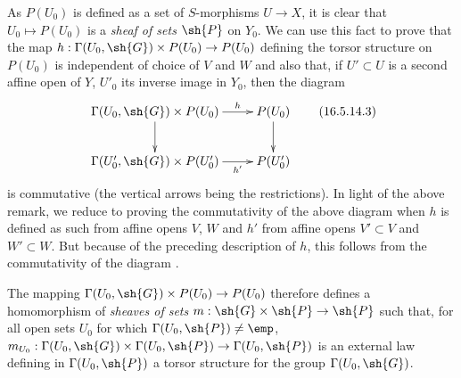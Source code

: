 \begin{env}[16.5.14]
As $P(U_0)$ is defined as a set of $S$-morphisms $U \to X$, it is clear that $U_0 \mapsto P(U_0)$ is a \emph{sheaf of sets} $\sh{P}$ on $Y_0$.
We can use this fact to prove that the map $h : \Gamma(U_0, \sh{G}) \times P(U_0) \to P(U_0)$ defining the torsor structure on $P(U_0)$ is independent of choice of $V$ and $W$ and also that, if $U' \subset U$ is a second affine open of $Y$, $U'_0$ its inverse image in $Y_0$, then the diagram
\[
\label{IV.16.5.14.3}
  \xymatrix{
    \Gamma(U_0, \sh{G}) \times P(U_0) \ar[d] \ar[r]^-h & P(U_0) \ar[d] \\
    \Gamma(U'_0, \sh{G}) \times P(U'_0) \ar[r]_-{h'} & P(U'_0)
  }
  \tag{16.5.14.3}
\]
is commutative (the vertical arrows being the restrictions).
In light of the above remark, we reduce to proving the commutativity of the above diagram when $h$ is defined as such from affine opens $V$, $W$ and $h'$ from affine
opens $V' \subset V$ and $W' \subset W$.
But because of the preceding description of $h$, this follows from the commutativity of the diagram .

The mapping $\Gamma(U_0, \sh{G}) \times P(U_0) \to P(U_0)$ therefore defines a homomorphism of \emph{sheaves of sets} $m:\sh{G} \times \sh{P} \to \sh{P}$ such that, for all open sets $U_0$ for which $\Gamma(U_0, \sh{P}) \neq \emp$, $m_{U_0}:\Gamma(U_0, \sh{G}) \times \Gamma(U_0, \sh{P}) \to \Gamma(U_0, \sh{P})$ is an external law defining in $\Gamma(U_0, \sh{P})$ a torsor structure for the group $\Gamma(U_0, \sh{G})$.
\end{env}

